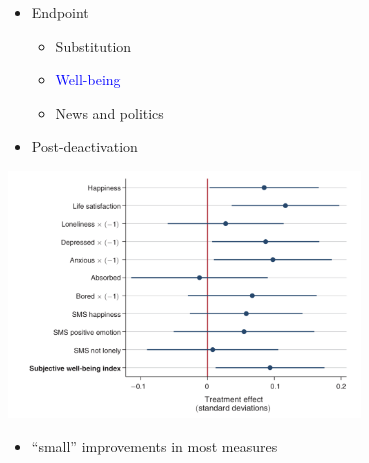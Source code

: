 \documentclass[aspectratio=169]{beamer}
\begin{document}
\begin{frame}

\begin{itemize}
\item Endpoint
\begin{itemize}
\item Substitution
\item \textcolor{blue}{Well-being}
\item News and politics
\end{itemize}
\item Post-deactivation
\end{itemize}

\end{frame}
\begin{frame}

\begin{center}
\includegraphics[width=0.7\textwidth]{figures/allcott_welfare_2020_fig5}
\end{center}

\begin{itemize}
\item ``small'' improvements in most measures
\end{itemize}

\end{frame}
\end{document}
